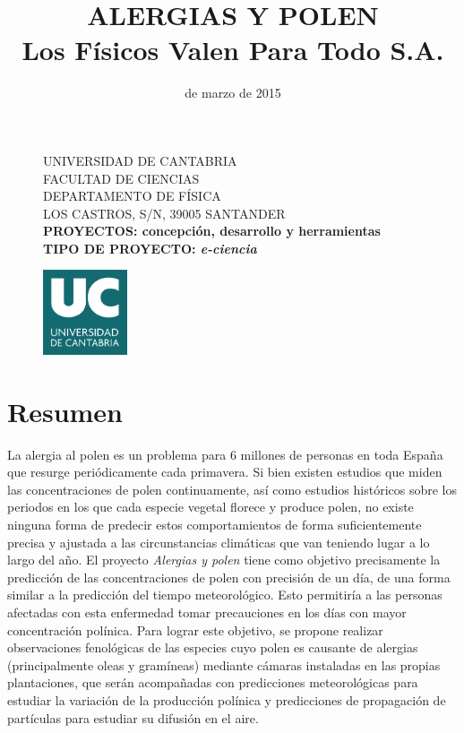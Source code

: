 \documentclass[12pt,oneside,a4paper]{article}
\title{\vspace*{40.0mm}
  \bf\sf ALERGIAS Y POLEN
         \vspace*{20.0mm} \\
  \vspace*{40.0mm}
  \Large\bf\sf Los Físicos Valen Para Todo S.A. \vspace*{20.0mm}}
\author{\sf }
\date{\sf 17 de marzo de 2015}
\makeatletter
\numberwithin{figure}{section}
\def\cleardoublepage{\clearpage\if@twoside \ifodd\c@page\else%
\hbox{}%
\thispagestyle{empty}%
\clearpage%
\if@twocolumn\hbox{}\clearpage\fi\fi\fi}
\makeatother
\begin{document}
\begin{figure}
  \parbox[t]{125mm}{
    \vspace*{6mm}
    \scriptsize\sf           UNIVERSIDAD DE CANTABRIA\\
    \scriptsize\sf           FACULTAD DE CIENCIAS\\
    \scriptsize\sf           DEPARTAMENTO DE FÍSICA \\
    \scriptsize\sf           LOS CASTROS, S/N, 39005 SANTANDER\\
    \scriptsize\sf\bfseries  PROYECTOS: concepción, desarrollo y herramientas\\
    \scriptsize\sf\bfseries  TIPO DE PROYECTO: \textit{e-ciencia}}
  \parbox[t]{40mm}{
    \begin{flushright}
      \includegraphics[height=25mm]{UC.jpg}
    \end{flushright}}
\end{figure}

\maketitle
\thispagestyle{empty}
\raggedbottom

\cleardoublepage
{}
\setcounter{tocdepth}{2}

\vspace*{\fill}
\section*{Resumen}
La alergia al polen es un problema para 6 millones de personas en toda España que resurge periódicamente cada primavera. Si bien existen estudios que miden las concentraciones de polen continuamente, así como estudios históricos sobre los periodos en los que cada especie vegetal florece y produce polen, no existe ninguna forma de predecir estos comportamientos de forma suficientemente precisa y ajustada a las circunstancias climáticas que van teniendo lugar a lo largo del año. El proyecto \textit{Alergias y polen} tiene como objetivo precisamente la predicción de las concentraciones de polen con precisión de un día, de una forma similar a la predicción del tiempo meteorológico. Esto permitiría a las personas afectadas con esta enfermedad tomar precauciones en los días con mayor concentración polínica. Para lograr este objetivo, se propone realizar observaciones fenológicas de las especies cuyo polen es causante de alergias (principalmente oleas y gramíneas) mediante cámaras instaladas en las propias plantaciones, que serán acompañadas con predicciones meteorológicas para estudiar la variación de la producción polínica y predicciones de propagación de partículas para estudiar su difusión en el aire.
\end{document}
